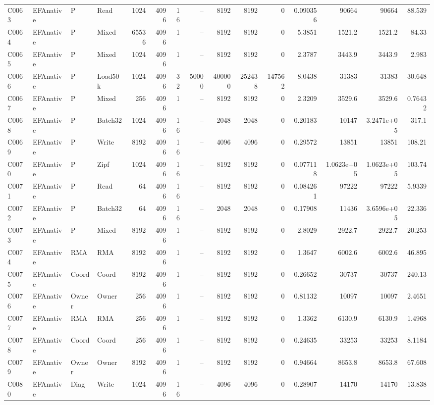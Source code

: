 \begin{landscape}
\begin{longtable}{llllrrrrrrrrrrr}
C0063 & EFAnative & P & Read & 1024 & 4096 & 16 & -- & 8192 & 8192 & 0 & 0.090356 & 90664 & 90664 & 88.539\\
C0064 & EFAnative & P & Mixed & 65536 & 4096 & 1 & -- & 8192 & 8192 & 0 & 5.3851 & 1521.2 & 1521.2 & 84.33\\
C0065 & EFAnative & P & Mixed & 1024 & 4096 & 1 & -- & 8192 & 8192 & 0 & 2.3787 & 3443.9 & 3443.9 & 2.983\\
C0066 & EFAnative & P & Load50k & 1024 & 4096 & 32 & 50000 & 400000 & 252438 & 147562 & 8.0438 & 31383 & 31383 & 30.648\\
C0067 & EFAnative & P & Mixed & 256 & 4096 & 1 & -- & 8192 & 8192 & 0 & 2.3209 & 3529.6 & 3529.6 & 0.76432\\
C0068 & EFAnative & P & Batch32 & 1024 & 4096 & 16 & -- & 2048 & 2048 & 0 & 0.20183 & 10147 & 3.2471e+05 & 317.1\\
C0069 & EFAnative & P & Write & 8192 & 4096 & 16 & -- & 4096 & 4096 & 0 & 0.29572 & 13851 & 13851 & 108.21\\
C0070 & EFAnative & P & Zipf & 1024 & 4096 & 16 & -- & 8192 & 8192 & 0 & 0.077118 & 1.0623e+05 & 1.0623e+05 & 103.74\\
C0071 & EFAnative & P & Read & 64 & 4096 & 16 & -- & 8192 & 8192 & 0 & 0.084261 & 97222 & 97222 & 5.9339\\
C0072 & EFAnative & P & Batch32 & 64 & 4096 & 16 & -- & 2048 & 2048 & 0 & 0.17908 & 11436 & 3.6596e+05 & 22.336\\
C0073 & EFAnative & P & Mixed & 8192 & 4096 & 1 & -- & 8192 & 8192 & 0 & 2.8029 & 2922.7 & 2922.7 & 20.253\\
C0074 & EFAnative & RMA & RMA & 8192 & 4096 & 1 & -- & 8192 & 8192 & 0 & 1.3647 & 6002.6 & 6002.6 & 46.895\\
C0075 & EFAnative & Coord & Coord & 8192 & 4096 & 1 & -- & 8192 & 8192 & 0 & 0.26652 & 30737 & 30737 & 240.13\\
C0076 & EFAnative & Owner & Owner & 256 & 4096 & 1 & -- & 8192 & 8192 & 0 & 0.81132 & 10097 & 10097 & 2.4651\\
C0077 & EFAnative & RMA & RMA & 256 & 4096 & 1 & -- & 8192 & 8192 & 0 & 1.3362 & 6130.9 & 6130.9 & 1.4968\\
C0078 & EFAnative & Coord & Coord & 256 & 4096 & 1 & -- & 8192 & 8192 & 0 & 0.24635 & 33253 & 33253 & 8.1184\\
C0079 & EFAnative & Owner & Owner & 8192 & 4096 & 1 & -- & 8192 & 8192 & 0 & 0.94664 & 8653.8 & 8653.8 & 67.608\\
C0080 & EFAnative & Diag & Write & 1024 & 4096 & 16 & -- & 4096 & 4096 & 0 & 0.28907 & 14170 & 14170 & 13.838\\

\end{longtable}
\end{landscape}
